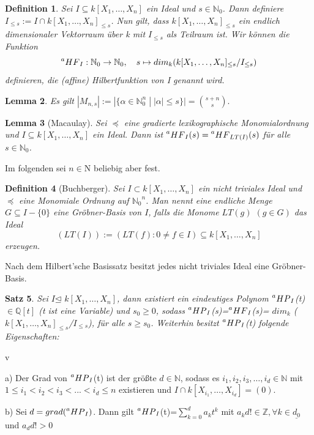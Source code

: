 \documentclass{article}
\newtheorem{satz}{Satz}
\newtheorem{definition}[satz]{Definition}
\newtheorem{lemma}[satz]{Lemma}
\newcommand*{\R}{k[X_{1},\ldots,X_{n}]}
\newcommand*{\indx}[2]{{#1}_{#2}}
\newcommand*{\potx}[2]{{#1}^{#2}}
\newcommand*{\N}{\mathbb{N}_0}
\newcommand*{\hf}[1]{$\prescript{a}{}{HF}_{#1}$}
\newcommand*{\hp}[1]{$\prescript{a}{}{HP}_{#1}$}
\newcommand*{\kette}[2]{$1\leq {#1}_1<{#1}_2<{#1}_3<...<{#1}_{#2}\leq n$}
\newcommand*{\dkette}[2]{${#1}_1,{#1}_2,{#1}_3,\ldots,{#1}_{#2} \in \mathbb{N}$}
\newcommand*{\ideal}{$I$}
\begin{document}
	\begin{definition} \label{1.2.11}
	Sei \(I \subseteq \R\) ein Ideal und \(s \in \mathbb{N}_{0}\). Dann definiere \(I_{\leq s} :=
	I \cap \R_{\leq s}\). Nun gilt, dass \(\R_{\leq s}\) ein endlich dimensionaler Vektorraum über
	k  mit \(I_{\leq s}\) als Teilraum ist. Wir können die Funktion \begin{displaymath}
	\prescript{a}{}{HF}_{I} : \mathbb{N}_{0} \rightarrow \mathbb{N}_{0}, \quad s \mapsto
	dim_{k}(\R_{\leq s}/I_{\leq s})	\end{displaymath} definieren, die (affine) Hilbertfunktion
	von I genannt wird.
	\end{definition}

	\begin{lemma}
	Es gilt \(|M_{n,s}| := |\{\alpha \in \mathbb{N}^{n}_{0}\; |\; |\alpha| \leq s \}| = \binom{s + n}{s}. \)
	\end{lemma}

	\begin{lemma}[Macaulay] \label{1.2.13}
	Sei \(\preceq\) eine gradierte lexikographische Monomialordnung und \(I \subseteq \R\) ein
	Ideal. Dann ist \(\prescript{a}{}{HF}_{I}(s) = \prescript{a}{}{HF}_{LT(I)}(s)\) für alle
	\(s \in \mathbb{N}_{0}\).
	\end{lemma}


Im folgenden sei $n \in \mathrm{N}$ beliebig aber fest.

\begin{definition}[Buchberger]
	Sei $I\subset \R$ ein nicht triviales Ideal und $\preceq$ eine Monomiale Ordnung auf $\potx{\N}{n}$. Man nennt eine endliche Menge $G\subseteq I-\{0\}$ eine Gröbner-Basis von $I$, falls die Monome $LT(g)$ $(g\in G)$ das Ideal 
	\begin{displaymath}
	(LT(I)):=(LT(f):0\neq f\in I)\subseteq \R
	\end{displaymath}
	erzeugen. 
\end{definition}

Nach dem Hilbert'sche Basissatz besitzt jedes nicht triviales Ideal eine Gröbner-Basis.\\

\begin{satz}
	\label{1.2.14}
	Sei  \ideal $\unlhd$ $\R$, dann existiert ein eindeutiges Polynom \hp{I}(t) $\in \mathbb{Q}[t]$ (t ist eine Variable) und $\indx{s}{0}\geq0$,  sodass \hp{I}(s)=\hf{I}(s)= $\indx{dim}{k}$ ($\indx{\R}{\leq s}$/$\indx{I}{\leq s}$), für alle $ s\geq\indx{s}{0}$. Weiterhin besitzt \hp{I}(t) folgende Eigenschaften:	
\end{satz}v
\begin{compactenum}
	\item[a)] Der Grad von \hp{I}(t) ist der größte $d \in \mathbb{N}$, sodass es \dkette{i}{d} mit \kette{i}{d} existieren und $I\cap k[X_{{i}_{1}},\ldots,X_{{i}_{d}}]=(0)$.
	\item[b)] Sei $d=grad(\textnormal{\hp{I}})$. Dann gilt \hp{I}(t)=$\sum_{k=0}^{d} \indx{a}{k}t^k$ mit $\indx{a}{k}d! \in \mathbb{Z}, \forall k\in \underline{\indx{d}{0}}$ und $\indx{a}{d}d!>0$\\
\end{compactenum}
\end{document}
